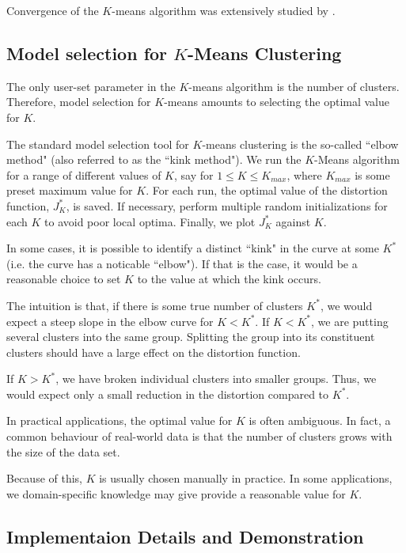 \documentclass[final,3p,times,twocolumn]{elsarticle}
\begin{document}
Convergence of the $K$-means algorithm was extensively studied by \cite{macqueen1967}.



\subsection{Model selection for $K$-Means Clustering}
\label{sect:kmeans-ms}
The only user-set parameter in the $K$-means algorithm is the number of clusters.
Therefore, model selection for $K$-means amounts to selecting the optimal value for $K$.

The standard model selection tool for $K$-means clustering is the so-called ``elbow method" (also referred to as the ``kink method").
We run the $K$-Means algorithm for a range of different values of $K$, say for $1 \leq K \leq K_{max}$, where $K_{max}$ is some preset maximum value for $K$.
For each run, the optimal value of the distortion function, $J^*_K$, is saved.
If necessary, perform multiple random initializations for each $K$ to avoid poor local optima.
Finally, we plot $J_K^*$ against $K$.

In some cases, it is possible to identify a distinct ``kink" in the curve at some $K^*$ (i.e. the curve has a noticable ``elbow").
If that is the case, it would be a reasonable choice to set $K$ to the value at which the kink occurs.

The intuition is that, if there is some true number of clusters $K^*$, we would expect a steep slope in the elbow curve for $K < K^*$.
If $K < K^*$, we are putting several clusters into the same group. 
Splitting the group into its constituent clusters should have a large effect on the distortion function.

If $K > K^*$, we have broken individual clusters into smaller groups.
Thus, we would expect only a small reduction in the distortion compared to $K^*$.

In practical applications, the optimal value for $K$ is often ambiguous.
In fact, a common behaviour of real-world data is that the number of clusters grows with the size of the data set.

Because of this, $K$ is usually chosen manually in practice.
In some applications, we domain-specific knowledge may give provide a reasonable value for $K$.

\subsection{Implementaion Details and Demonstration}
\end{document}
